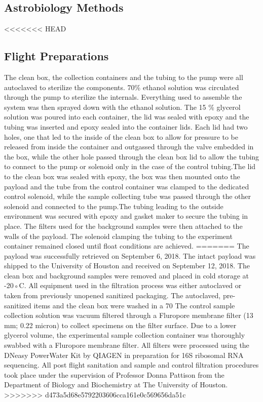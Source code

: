 \subsection{Astrobiology Methods}
\label{sec:Astrobiology Methods}
<<<<<<< HEAD
\subsection{ Flight Preparations }
 The clean box, the collection containers and the tubing to the pump were all autoclaved to sterilize the components. 70\% ethanol solution was circulated through the pump to sterilize the internals. Everything used to assemble the system was then sprayed down with the ethanol solution. The  15 \% glycerol solution was poured into each container, the lid was sealed with epoxy and the tubing was inserted and epoxy sealed into the container lids. Each lid had two holes, one that led to the inside of the clean box to allow for pressure to be released from inside the container and outgassed  through the valve embedded in the box, while the other hole passed through the clean box lid to allow the tubing to connect to the pump or solenoid only in the case of the control tubing.The lid to the clean box was sealed with epoxy, the box was then mounted onto the payload and the tube from the control container was clamped to the dedicated control solenoid, while the sample collecting tube was passed through the other solenoid and connected to the pump.The tubing leading to the outside environment was secured with epoxy and gasket maker to secure the tubing in place. The filters used for the background samples were then attached to the walls of the payload. The solenoid clamping the tubing to the experiment container remained closed until float conditions are achieved. 
=======
The payload was successfully retrieved on September 6, 2018. The intact payload was shipped to the University of Houston and received on September 12, 2018. The clean box and background samples were removed and placed in cold storage at -20◦C. All equipment used in the filtration process was either autoclaved or taken from previously unopened sanitized packaging. The autoclaved, pre-sanitized items and the clean box were washed in a 70 %
The control sample collection solution was vacuum filtered through a Fluropore membrane filter (13 mm; 0.22 micron) to collect specimens on the filter surface. Due to a lower glycerol volume, the experimental sample collection container was thoroughly swabbed with a Fluropore membrane filter. All filters were processed using the DNeasy PowerWater Kit by QIAGEN in preparation for 16S ribosomal RNA sequencing. All post flight sanitation and sample and control filtration procedures took place under the supervision of Professor Donna Pattison from the Department of Biology and Biochemistry at The University of Houston.
>>>>>>> d473a5d68e5792203606cca161e0c569656da51c

